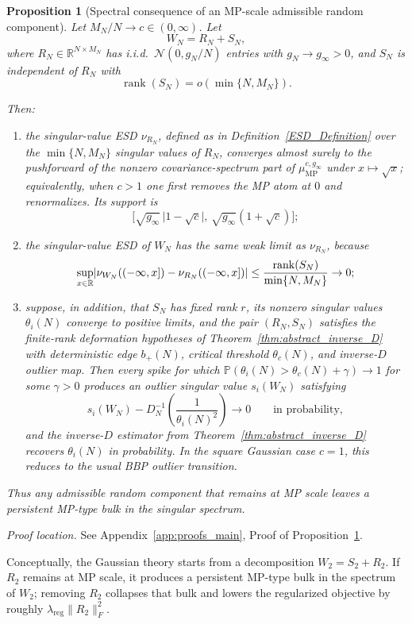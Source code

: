 \documentclass[11pt]{article}
\theoremstyle{plain}
\newtheorem{prop}[thm]{Proposition}
\theoremstyle{definition}
\theoremstyle{remark}
\DeclarePairedDelimiter{\abs}{\lvert}{\rvert}
\newcommand{\R}{\mathbb{R}}
\newcommand{\PP}{\mathbb{P}}
\newcommand{\rank}{\operatorname{rank}}
\newcommand{\1}{\mathbf{1}}
\newcommand{\proofloc}[1]{\par\noindent\emph{Proof location.} #1\par}
\begin{document}
\begin{prop}[Spectral consequence of an MP-scale admissible random component]
\label{prop:mp_bulk_interpretation}
Let \(M_N/N\to c\in(0,\infty)\). Let
\[
W_N=R_N+S_N,
\]
where \(R_N\in\R^{N\times M_N}\) has i.i.d.\ \( \mathcal N(0,g_N/N)\) entries with \(g_N\to g_\infty>0\), and \(S_N\) is independent of \(R_N\) with
\[
\rank(S_N)=o(\min\{N,M_N\}).
\]

Then:
\begin{enumerate}[leftmargin=2em]
\item the singular-value ESD \(\nu_{R_N}\), defined as in Definition~\ref{ESD_Definition} over the \(\min\{N,M_N\}\) singular values of \(R_N\), converges almost surely to the pushforward of the \emph{nonzero covariance-spectrum part} of \(\mu_{\mathrm{MP}}^{c,g_\infty}\) under \(x\mapsto \sqrt{x}\); equivalently, when \(c>1\) one first removes the MP atom at \(0\) and renormalizes. Its support is
\[
\Big[\sqrt{g_\infty}\,\big|1-\sqrt c\big|,\,\sqrt{g_\infty}(1+\sqrt c)\Big];
\]
\item the singular-value ESD of \(W_N\) has the same weak limit as \(\nu_{R_N}\), because
\[
\sup_{x\in\R}
\abs{
\nu_{W_N}((-\infty,x])-\nu_{R_N}((-\infty,x])
}
\le
\frac{\rank(S_N)}{\min\{N,M_N\}}
\to0;
\]
\item suppose, in addition, that \(S_N\) has fixed rank \(r\), its nonzero singular values \(\theta_i(N)\) converge to positive limits, and the pair \((R_N,S_N)\) satisfies the finite-rank deformation hypotheses of Theorem~\ref{thm:abstract_inverse_D} with deterministic edge \(b_+(N)\), critical threshold \(\theta_c(N)\), and inverse-\(D\) outlier map. Then every spike for which \(\PP(\theta_i(N)>\theta_c(N)+\gamma)\to1\) for some \(\gamma>0\) produces an outlier singular value \(s_i(W_N)\) satisfying
\[
s_i(W_N)-D_N^{-1}\!\left(\frac1{\theta_i(N)^2}\right)\to0
\qquad\text{in probability},
\]
and the inverse-\(D\) estimator from Theorem~\ref{thm:abstract_inverse_D} recovers \(\theta_i(N)\) in probability. In the square Gaussian case \(c=1\), this reduces to the usual BBP outlier transition.
\end{enumerate}
Thus any admissible random component that remains at MP scale leaves a persistent MP-type bulk in the singular spectrum.
\end{prop}
\proofloc{See Appendix~\ref{app:proofs_main}, Proof of Proposition~\ref{prop:mp_bulk_interpretation}.}

Conceptually, the Gaussian theory starts from a decomposition \(W_2=S_2+R_2\). If \(R_2\) remains at MP scale, it produces a persistent MP-type bulk in the spectrum of \(W_2\); removing \(R_2\) collapses that bulk and lowers the regularized objective by roughly \(\lambda_{\mathrm{reg}}\|R_2\|_F^2\).
\end{document}
